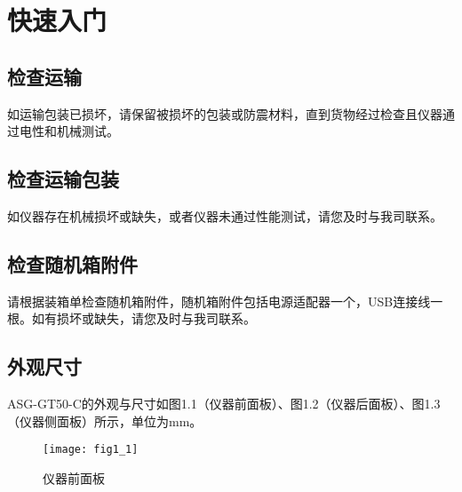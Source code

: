 \chapter{\heiti 快速入门}
{
\fancyhf{}
\renewcommand{\headrulewidth}{2.4pt}
\renewcommand{\footrulewidth}{2.4pt}
\chead{}
\cfoot{}
\fancyfoot[RO,LE]{\xiaosi\textbf{\thepage}}
}


\pagestyle{fancy}
\renewcommand{\headrulewidth}{1.5pt}
\renewcommand{\footrulewidth}{1.5pt}
\chead{}
\cfoot{}
\fancyfoot[RO,LE]{\xiaosi\textbf{\thepage}}


\setcounter{page}{1}
\setmainfont{Times New Roman}
\section{\heiti 检查运输}
如运输包装已损坏，请保留被损坏的包装或防震材料，直到货物经过检查且仪器通过电性和机械测试。

\section{\heiti 检查运输包装}
如仪器存在机械损坏或缺失，或者仪器未通过性能测试，请您及时与我司联系。

\section{\heiti 检查随机箱附件}
请根据装箱单检查随机箱附件，随机箱附件包括电源适配器一个，USB连接线一根。如有损坏或缺失，请您及时与我司联系。


\section{\heiti 外观尺寸}
ASG-GT50-C的外观与尺寸如图1.1（仪器前面板）、图1.2（仪器后面板）、图1.3（仪器侧面板）所示，单位为mm。
\begin{figure}[ht]
\centering
\texttt{[image: fig1\_1]}
\caption{仪器前面板}\label{fig:fig1_1}
\end{figure}

